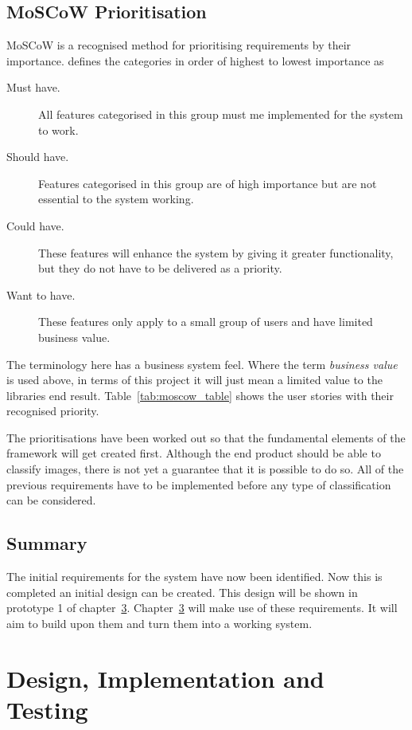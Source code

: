 \documentclass[11pt,oneside]{report}
\begin{document}
		\section{MoSCoW Prioritisation}
			MoSCoW is a recognised method for prioritising requirements by their importance.  defines the categories in order of highest to lowest importance as
			\begin{description}
				\item[Must have. ] All features categorised in this group must me implemented for the system to work.
				\item[Should have. ] Features categorised in this group are of high importance but are not essential to the system working.
				\item[Could have. ] These features will enhance the system by giving it greater functionality, but they do not have to be delivered as a priority.
				\item[Want to have. ] These features only apply to a small group of users and have limited business value.
			\end{description}
			The terminology here has a business system feel.
			Where the term \textit{business value} is used above, in terms of this project it will just mean a limited value to the libraries end result.
			Table~\ref{tab:moscow_table} shows the user stories with their recognised priority.
			
			\clearpage
			The prioritisations have been worked out so that the fundamental elements of the framework will get created first.
			Although the end product should be able to classify images, there is not yet a guarantee that it is possible to do so.
			All of the previous requirements have to be implemented before any type of classification can be considered.
		\section{Summary}
			The initial requirements for the system have now been identified.
			Now this is completed an initial design can be created.
			This design will be shown in prototype 1 of chapter~\ref{chap:des&imp}.
			Chapter~\ref{chap:des&imp} will make use of these requirements.
			It will aim to build upon them and turn them into a working system.
    		
	
	\chapter{Design, Implementation and Testing}\label{chap:des&imp}
\end{document}
